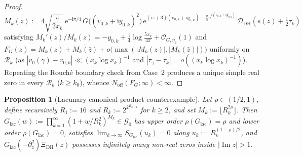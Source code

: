 \documentclass[11pt,a4paper,reqno]{amsart}
\newtheorem{proposition}[theorem]{Proposition}
\theoremstyle{definition}
\theoremstyle{remark}
\numberwithin{equation}{section}
\newcommand{\ii}{\mathrm{i}}
\newcommand{\ee}{\mathrm{e}}
\DeclareMathOperator{\Imop}{Im}
\begin{document}
\begin{proof}
\begin{equation*}
  M_k(z)
  := 4\sqrt{\frac{\pi}{2x_k}}\,\ee^{-\ii\pi/4}\,G\bigl((v_{0,k} + \ii y_{0,k})^2\bigr)\,
  \ee^{(\ii z + 3)(v_{0,k} + \ii y_{0,k}) - \frac{\pi}{5}\ee^{4(v_{0,k} + \ii y_{0,k})}}\,
  \mathcal{D}_{\mathrm{DH}}\!\left(s(z) + \tfrac{1}{2}\tau_k\right)
\end{equation*}
satisfying $M_k'(z)/M_k(z) = -y_{0,k} + \frac{\ii}{4}\log\frac{5x_k}{4\pi} + \mathcal{O}_{G,\eta_2}(1)$ and $F_G(z) = M_k(z) + \overline{M_k(\bar{z})} + o\bigl(\max(|M_k(z)|, |M_k(\bar{z})|)\bigr)$ uniformly on $\mathcal{R}_k$ (as $|v_0(\gamma) - v_{0,k}| \ll (x_k\log x_k)^{-1}$ and $|\tau_\gamma - \tau_k| = o((x_k\log x_k)^{-1})$). Repeating the Rouch\'e boundary check from Case~2 produces a unique simple real zero in every $\mathcal{R}_k$ ($k \ge k_0$), whence $N_{\mathrm{off}}(F_G; \infty) < \infty$.
\end{proof}

\begin{proposition}[Lacunary canonical product counterexample]
\label{prop:lacunary}
Let $\rho \in (1/2, 1)$, define recursively $R_1 := 16$ and $R_k := 2^{2^{R_{k-1}}}$ for $k \ge 2$, and set $M_k := \lfloor R_k^{2\rho}\rfloor$. Then $G_{\mathrm{lac}}(w) := \prod_{k=1}^{\infty}(1 + w/R_k^2)^{M_k} \in \mathcal{G}_0$ has upper order $\rho(G_{\mathrm{lac}}) = \rho$ and lower order $\underline{\rho}(G_{\mathrm{lac}}) = 0$, satisfies $\lim_{k\to\infty} S_{G_{\mathrm{lac}}}(u_k) = 0$ along $u_k := R_k^{(1-\rho)/2}$, and $G_{\mathrm{lac}}(-\partial_z^2)\Xi_{\mathrm{DH}}(z)$ possesses infinitely many non-real zeros inside $|\Imop z| > 1$.
\end{proposition}
\end{document}
